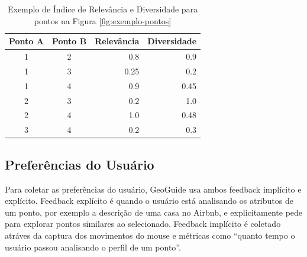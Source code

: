 \begin{table}[]
	\centering
	\begin{tabular}{|c|c|r|r|}
	\hline
	\multicolumn{1}{|c|}{\textbf{Ponto A}} & \multicolumn{1}{c|}{\textbf{Ponto B}} & \multicolumn{1}{c|}{\textbf{Relevância}} & \multicolumn{1}{c|}{\textbf{Diversidade}} \\ \hline
	1                                      & 2                                     & 0.8                                      & 0.9                                       \\ \hline
	1                                      & 3                                     & 0.25                                     & 0.2                                       \\ \hline
	1                                      & 4                                     & 0.9                                      & 0.45                                      \\ \hline
	2                                      & 3                                     & 0.2                                      & 1.0                                       \\ \hline
	2                                      & 4                                     & 1.0                                      & 0.48                                      \\ \hline
	3                                      & 4                                     & 0.2                                      & 0.3                                       \\ \hline
	\end{tabular}
	\caption{Exemplo de Índice de Relevância e Diversidade para pontos na Figura \ref{fig:exemplo-pontos}}
	\label{table:exemplo-indice}
\end{table}



\subsection{Preferências do Usuário}

Para coletar as preferências do usuário, GeoGuide usa ambos feedback implícito e explícito. Feedback explícito é quando o usuário está analisando os atributos de um ponto, por exemplo a descrição de uma casa no Airbnb, e explicitamente pede para explorar pontos similares ao selecionado. Feedback implícito é coletado atráves da captura dos movimentos do mouse e métricas como  ``quanto tempo o usuário passou analisando o perfil de um ponto''.

